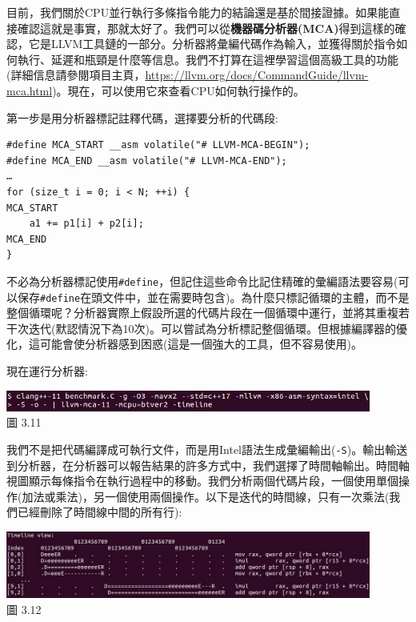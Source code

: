 目前，我們關於CPU並行執行多條指令能力的結論還是基於間接證據。如果能直接確認這就是事實，那就太好了。我們可以從\textbf{機器碼分析器(MCA)}得到這樣的確認，它是LLVM工具鏈的一部分。分析器將彙編代碼作為輸入，並獲得關於指令如何執行、延遲和瓶頸是什麼等信息。我們不打算在這裡學習這個高級工具的功能(詳細信息請參閱項目主頁，\url{https://llvm.org/docs/CommandGuide/llvm-mca.html})。現在，可以使用它來查看CPU如何執行操作的。

第一步是用分析器標記註釋代碼，選擇要分析的代碼段:

\begin{lstlisting}[style=styleCXX]
#define MCA_START __asm volatile("# LLVM-MCA-BEGIN");
#define MCA_END __asm volatile("# LLVM-MCA-END");
…
for (size_t i = 0; i < N; ++i) {
MCA_START
	a1 += p1[i] + p2[i];
MCA_END
}
\end{lstlisting}

不必為分析器標記使用\texttt{\#define}，但記住這些命令比記住精確的彙編語法要容易(可以保存\texttt{\#define}在頭文件中，並在需要時包含)。為什麼只標記循環的主體，而不是整個循環呢？分析器實際上假設所選的代碼片段在一個循環中運行，並將其重複若干次迭代(默認情況下為10次)。可以嘗試為分析標記整個循環。但根據編譯器的優化，這可能會使分析器感到困惑(這是一個強大的工具，但不容易使用)。

現在運行分析器:

\begin{center}
\includegraphics[width=0.9\textwidth]{content/1/chapter3/images/11.jpg}\\
圖 3.11
\end{center}

我們不是把代碼編譯成可執行文件，而是用Intel語法生成彙編輸出(\texttt{-S})。輸出輸送到分析器，在分析器可以報告結果的許多方式中，我們選擇了時間軸輸出。時間軸視圖顯示每條指令在執行過程中的移動。我們分析兩個代碼片段，一個使用單個操作(加法或乘法)，另一個使用兩個操作。以下是迭代的時間線，只有一次乘法(我們已經刪除了時間線中間的所有行):

\begin{center}
\includegraphics[width=0.9\textwidth]{content/1/chapter3/images/12.jpg}\\
圖 3.12
\end{center}

